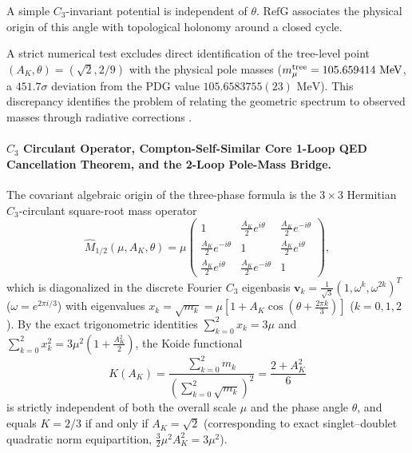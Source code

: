 \documentclass[11pt,a4paper]{article}
\newcommand{\RefG}{\mathrm{RefG}}
\begin{document}
A simple $C_3$-invariant potential is independent of $\theta$. $\RefG$ associates the physical origin of this angle with topological holonomy around a closed cycle.

A strict numerical test excludes direct identification of the tree-level point $(A_K,\theta)=(\sqrt2,2/9)$ with the physical pole masses ($m_\mu^{\rm tree} = 105.659414\text{ MeV}$, a $451.7\sigma$ deviation from the PDG value $105.6583755(23)\text{ MeV}$). This discrepancy identifies the problem of relating the geometric spectrum to observed masses through radiative corrections \citep{sumino2009}.

\paragraph{$C_3$ Circulant Operator, Compton-Self-Similar Core 1-Loop QED Cancellation Theorem, and the 2-Loop Pole-Mass Bridge.} The covariant algebraic origin of the three-phase formula is the $3\times 3$ Hermitian $C_3$-circulant square-root mass operator
\begin{equation}
\widehat{M}_{1/2}(\mu, A_K, \theta) = \mu\begin{pmatrix} 1 & \frac{A_K}{2}e^{i\theta} & \frac{A_K}{2}e^{-i\theta} \\[4pt] \frac{A_K}{2}e^{-i\theta} & 1 & \frac{A_K}{2}e^{i\theta} \\[4pt] \frac{A_K}{2}e^{i\theta} & \frac{A_K}{2}e^{-i\theta} & 1 \end{pmatrix},
\end{equation}
which is diagonalized in the discrete Fourier $C_3$ eigenbasis $\mathbf{v}_k = \frac{1}{\sqrt{3}}(1, \omega^k, \omega^{2k})^T$ ($\omega = e^{2\pi i/3}$) with eigenvalues $x_k = \sqrt{m_k} = \mu\left[1 + A_K\cos\!\left(\theta + \frac{2\pi k}{3}\right)\right]$ ($k=0,1,2$). By the exact trigonometric identities $\sum_{k=0}^2 x_k = 3\mu$ and $\sum_{k=0}^2 x_k^2 = 3\mu^2\left(1 + \frac{A_K^2}{2}\right)$, the Koide functional
\begin{equation}
K(A_K) = \frac{\sum_{k=0}^2 m_k}{\left(\sum_{k=0}^2 \sqrt{m_k}\right)^2} = \frac{2 + A_K^2}{6}
\end{equation}
is strictly independent of both the overall scale $\mu$ and the phase angle $\theta$, and equals $K = 2/3$ if and only if $A_K = \sqrt{2}$ (corresponding to exact singlet--doublet quadratic norm equipartition, $\frac{3}{2}\mu^2 A_K^2 = 3\mu^2$).
\end{document}
